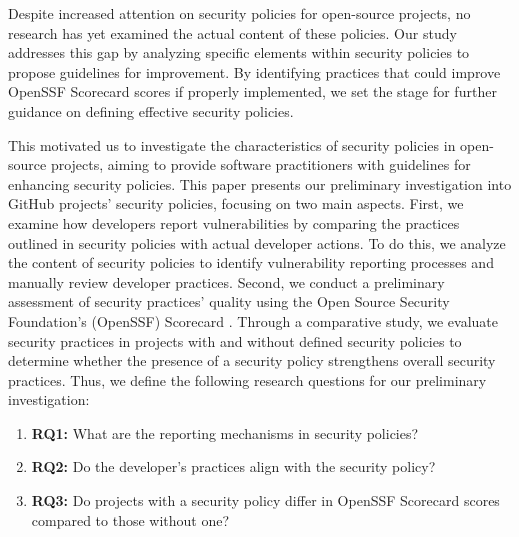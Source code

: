 Despite increased attention on security policies for open-source projects, no research has yet examined the actual content of these policies. Our study addresses this gap by analyzing specific elements within security policies to propose guidelines for improvement. By identifying practices that could improve OpenSSF Scorecard scores if properly implemented, we set the stage for further guidance on defining effective security policies.


This motivated us to investigate the characteristics of security policies in open-source projects, aiming to provide software practitioners with guidelines for enhancing security policies. This paper presents our preliminary investigation into GitHub projects' security policies, focusing on two main aspects. First, we examine how developers report vulnerabilities by comparing the practices outlined in security policies with actual developer actions. To do this, we analyze the content of security policies to identify vulnerability reporting processes and manually review developer practices. Second, we conduct a preliminary assessment of security practices' quality using the Open Source Security Foundation's (OpenSSF) Scorecard \cite{Scorecard:online}. Through a comparative study, we evaluate security practices in projects with and without defined security policies to determine whether the presence of a security policy strengthens overall security practices. Thus, we define the following research questions for our preliminary investigation:

\begin{enumerate}
    \item \textbf{RQ1:} What are the reporting mechanisms in security policies?
    \item \textbf{RQ2:} Do the developer's practices align with the security policy?
    \item \textbf{RQ3:} Do projects with a security policy differ in OpenSSF Scorecard scores compared to those without one?
\end{enumerate}






